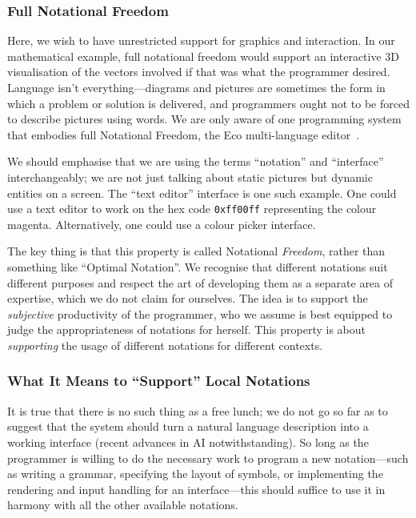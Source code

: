 \documentclass[ twoside,openright,titlepage,numbers=noenddot,headinclude,footinclude,cleardoublepage=empty,abstract=on,
                BCOR=5mm,paper=a4,fontsize=11pt
                ]{scrreprt}
\theoremstyle{definition}
\begin{document}
\hypertarget{full-notational-freedom}{\subsubsection{Full Notational Freedom}\label{full-notational-freedom}}

Here, we wish to have unrestricted support for graphics and interaction.
In our mathematical example, full notational freedom would support an
interactive 3D visualisation of the vectors involved if that was what
the programmer desired. Language isn't everything---diagrams and
pictures are sometimes the form in which a problem or solution is
delivered, and programmers ought not to be forced to describe pictures
using words. We are only aware of one programming system that embodies
full Notational Freedom, the Eco multi-language editor~\parencite{Eco}.

We should emphasise that we are using the terms ``notation'' and
``interface'' interchangeably; we are not just talking about static
pictures but dynamic entities on a screen. The ``text editor'' interface
is one such example. One could use a text editor to work on the hex code
\texttt{0xff00ff} representing the colour magenta. Alternatively, one
could use a colour picker interface.

The key thing is that this property is called Notational \emph{Freedom},
rather than something like ``Optimal Notation''. We recognise that
different notations suit different purposes and respect the art of
developing them as a separate area of expertise, which we do not claim
for ourselves. The idea is to support the \emph{subjective} productivity
of the programmer, who we assume is best equipped to judge the
appropriateness of notations for herself. This property is about
\emph{supporting} the usage of different notations for different
contexts.

\hypertarget{what-it-means-to-support-local-notations}{\subsubsection{What It Means to ``Support'' Local
Notations}\label{what-it-means-to-support-local-notations}}

It is true that there is no such thing as a free lunch; we do not go so
far as to suggest that the system should turn a natural language
description into a working interface (recent advances in AI
notwithstanding). So long as the programmer is willing to do the
necessary work to program a new notation---such as writing a grammar,
specifying the layout of symbols, or implementing the rendering and
input handling for an interface---this should suffice to use it in
harmony with all the other available notations.
\end{document}
